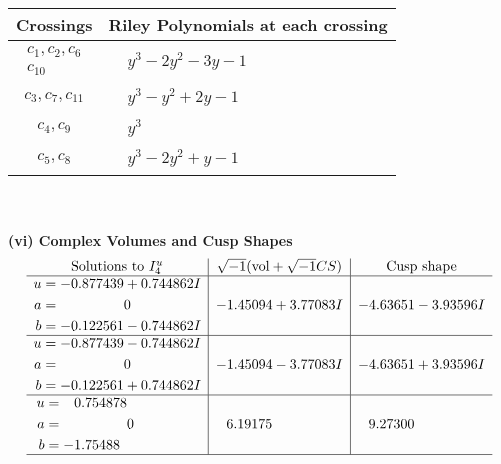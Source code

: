 \documentclass[1p]{elsarticle_modified}
\theoremstyle{definition}
\newcommand{\I}{\sqrt{-1}}
\begin{document}
\begin{tabular}{m{50pt}|m{274pt}}
Crossings & \hspace{64pt}Riley Polynomials at each crossing \\
\hline $$\begin{aligned}c_{1},c_{2},c_{6}\\c_{10}\end{aligned}$$&$\begin{aligned}
&y^3-2 y^2-3 y-1
\end{aligned}$\\
\hline $$\begin{aligned}c_{3},c_{7},c_{11}\end{aligned}$$&$\begin{aligned}
&y^3- y^2+2 y-1
\end{aligned}$\\
\hline $$\begin{aligned}c_{4},c_{9}\end{aligned}$$&$\begin{aligned}
&y^3
\end{aligned}$\\
\hline $$\begin{aligned}c_{5},c_{8}\end{aligned}$$&$\begin{aligned}
&y^3-2 y^2+y-1
\end{aligned}$\\
\hline
\end{tabular}\\~\\
\newpage\flushleft \textbf{(vi) Complex Volumes and Cusp Shapes}
$$\begin{array}{c|c|c}  
\text{Solutions to }I^u_{4}& \I (\text{vol} + \sqrt{-1}CS) & \text{Cusp shape}\\
 \hline 
\begin{aligned}
u &= -0.877439 + 0.744862 I \\
a &= \phantom{-0.000000 } 0 \\
b &= -0.122561 - 0.744862 I\end{aligned}
 & -1.45094 + 3.77083 I & -4.63651 - 3.93596 I \\ \hline\begin{aligned}
u &= -0.877439 - 0.744862 I \\
a &= \phantom{-0.000000 } 0 \\
b &= -0.122561 + 0.744862 I\end{aligned}
 & -1.45094 - 3.77083 I & -4.63651 + 3.93596 I \\ \hline\begin{aligned}
u &= \phantom{-}0.754878\phantom{ +0.000000I} \\
a &= \phantom{-0.000000 } 0 \\
b &= -1.75488\phantom{ +0.000000I}\end{aligned}
 & \phantom{-}6.19175\phantom{ +0.000000I} & \phantom{-}9.27300\phantom{ +0.000000I}\\
 \hline 
 \end{array}$$\newpage
\end{document}
